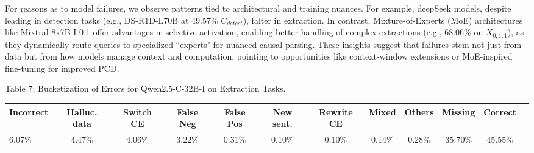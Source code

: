 \documentclass[conference]{IEEEtran}
\begin{document}
For reasons as to model failures, we observe patterns tied to architectural and training nuances. For example, deepSeek models, despite leading in detection tasks (e.g., DS-R1D-L70B at 49.57\% $C_{detect}$), falter in extraction. In contrast, Mixture-of-Experts (MoE) architectures like Mixtral-8x7B-I-0.1 offer advantages in selective activation, enabling better handling of complex extractions (e.g., 68.06\% on $X_{0,1,1}$), as they dynamically route queries to specialized ``experts" for nuanced causal parsing. These insights suggest that failures stem not just from data but from how models manage context and computation, pointing to opportunities like context-window extensions or MoE-inspired fine-tuning for improved PCD.

    \begin{table}[ht]
    \centering
    \scriptsize
    \setlength{\tabcolsep}{3pt}
    Table 7: {Bucketization of Errors for Qwen2.5-C-32B-I on Extraction Tasks.}
    \begin{tabular*}{\linewidth}{@{\extracolsep{\fill}} lccccccccccc }
    \toprule
    Incorrect & Halluc. data & Switch CE & False Neg & False Pos & New sent. & Rewrite CE & Mixed & Others & Missing & Correct \\
    \midrule
    6.07\% & 4.47\% & 4.06\% & 3.22\% & 0.31\% & 0.10\% & 0.10\% & 0.14\% & 0.28\% & 35.70\% & 45.55\% \\
    \bottomrule
    \end{tabular*}
    
    \label{tab:error-distribution}
    \end{table}
\end{document}
